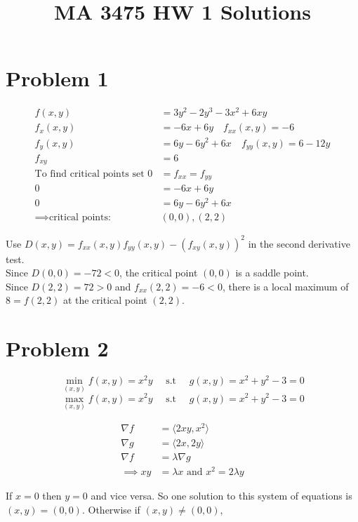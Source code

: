 \documentclass[a4paper]{article}
\title{MA 3475 HW 1 Solutions}
\begin{document}
\maketitle

\section*{Problem 1}

\begin{align*}
f(x,y) & = 3y^2 -2y^3 -3x^2 + 6xy \\
f_x(x,y) &= -6x + 6y \quad f_{xx}(x,y) = -6 \\
f_y(x,y) &= 6y - 6y^2 + 6x \quad f_{yy}(x,y) = 6-12y \\
f_{xy} &= 6\\
\text{To find critical points set } 0&=f_{xx}= f_{yy}\\
0 &= -6x + 6y \\
0 &= 6y - 6y^2 + 6x \\
\implies \text{critical points: } & (0,0), (2,2) 
\end{align*}

Use $D(x,y) = f_{xx}(x,y)f_{yy}(x,y) - \left(f_{xy}(x,y)\right)^2$ in the second derivative test.\\

Since $D(0,0) = -72 < 0$, the critical point $(0,0)$ is a saddle point. \\

Since $D(2,2)= 72 > 0$ and $f_{xx}(2,2) = -6 < 0$, there is a local maximum of $8 = f(2,2)$ at the critical point $(2,2)$. 

\section*{Problem 2}

$$\min_{(x,y)} f(x,y) = x^2y \quad \text{ s.t }\quad  g(x,y) = x^2 + y^2 -3 = 0 $$
$$\max_{(x,y)} f(x,y) = x^2y \quad \text{ s.t } \quad g(x,y) = x^2 + y^2 -3 = 0 $$

\begin{align*}
\nabla f &= \langle 2xy, x^2 \rangle \\
\nabla g &= \langle 2x, 2y \rangle \\
\nabla f &= \lambda \nabla g \\
\implies xy &= \lambda x \text{ and } x^2 = 2\lambda y
\end{align*}

If $x = 0$ then $y=0$ and vice versa. So one solution to this system of equations is $(x,y) = (0,0)$. Otherwise if $(x,y) \neq (0,0)$,
\end{document}
